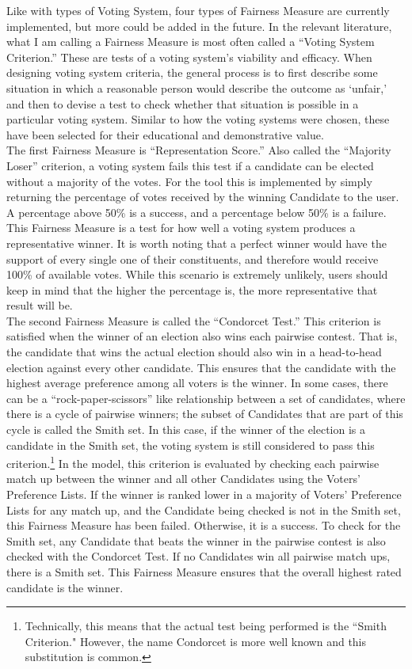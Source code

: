 \documentclass[12pt]{article}
\begin{document}
\qquad Like with types of Voting System, four types of Fairness Measure are currently implemented, but more could be added in the future. In the relevant literature, what I am calling a Fairness Measure is most often called a ``Voting System Criterion.'' These are tests of a voting system's viability and efficacy. When designing voting system criteria, the general process is to first describe some situation in which a reasonable person would describe the outcome as `unfair,' and then to devise a test to check whether that situation is possible in a particular voting system. Similar to how the voting systems were chosen, these have been selected for their educational and demonstrative value. \\

\qquad The first Fairness Measure is ``Representation Score.'' Also called the ``Majority Loser'' criterion, a voting system fails this test if a candidate can be elected without a majority of the votes. For the tool this is implemented by simply returning the percentage of votes received by the winning Candidate to the user. A percentage above 50\% is a success, and a percentage below 50\% is a failure. This Fairness Measure is a test for how well a voting system produces a representative winner. It is worth noting that a perfect winner would have the support of every single one of their constituents, and therefore would receive 100\% of available votes. While this scenario is extremely unlikely, users should keep in mind that the higher the percentage is, the more representative that result will be. \\

\qquad The second Fairness Measure is called the ``Condorcet Test.'' This criterion is satisfied when the winner of an election also wins each pairwise contest. That is, the candidate that wins the actual election should also win in a head-to-head election against every other candidate. This ensures that the candidate with the highest average preference among all voters is the winner. In some cases, there can be a ``rock-paper-scissors'' like relationship between a set of candidates, where there is a cycle of pairwise winners; the subset of Candidates that are part of this cycle is called the Smith set. In this case, if the winner of the election is a candidate in the Smith set, the voting system is still considered to pass this criterion.\footnote{Technically, this means that the actual test being performed is the ``Smith Criterion." However, the name Condorcet is more well known and this substitution is common.} In the model, this criterion is evaluated by checking each pairwise match up between the winner and all other Candidates using the Voters' Preference Lists. If the winner is ranked lower in a majority of Voters' Preference Lists for any match up, and the Candidate being checked is not in the Smith set, this Fairness Measure has been failed. Otherwise, it is a success. To check for the Smith set, any Candidate that beats the winner in the pairwise contest is also checked with the Condorcet Test. If no Candidates win all pairwise match ups, there is a Smith set. This Fairness Measure ensures that the overall highest rated candidate is the winner. \\
\end{document}
